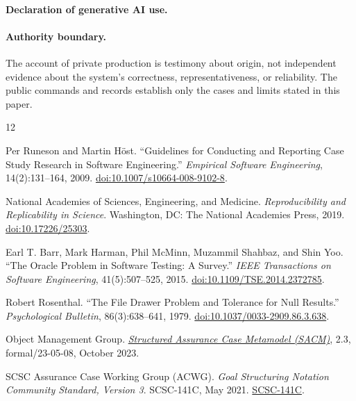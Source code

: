 \documentclass[11pt]{article}
\begin{document}
\paragraph{Declaration of generative AI use.} \paperfullaideclaration

\paragraph{Authority boundary.}
The account of private production is testimony about origin, not independent
evidence about the system's correctness, representativeness, or reliability.
The public commands and records establish only the cases and limits stated in
this paper.

\begin{thebibliography}{12}
\fontsize{7.5pt}{8.3pt}\selectfont
\raggedright
\setlength{\itemsep}{0pt}
\setlength{\parsep}{0pt}
\setlength{\parskip}{0pt}

Per Runeson and Martin H\"ost. ``Guidelines for Conducting and Reporting Case
Study Research in Software Engineering.'' \emph{Empirical Software
Engineering}, 14(2):131--164, 2009.
\href{https://doi.org/10.1007/s10664-008-9102-8}{doi:10.1007/s10664-008-9102-8}.

National Academies of Sciences, Engineering, and Medicine.
\emph{Reproducibility and Replicability in Science}. Washington, DC:
The National Academies Press, 2019.
\href{https://doi.org/10.17226/25303}{doi:10.17226/25303}.

Earl T. Barr, Mark Harman, Phil McMinn, Muzammil Shahbaz, and Shin Yoo.
``The Oracle Problem in Software Testing: A Survey.''
\emph{IEEE Transactions on Software Engineering}, 41(5):507--525, 2015.
\href{https://doi.org/10.1109/TSE.2014.2372785}{doi:10.1109/TSE.2014.2372785}.

Robert Rosenthal. ``The File Drawer Problem and Tolerance for Null Results.''
\emph{Psychological Bulletin}, 86(3):638--641, 1979.
\href{https://doi.org/10.1037/0033-2909.86.3.638}{doi:10.1037/0033-2909.86.3.638}.

Object Management Group.
\href{https://www.omg.org/spec/SACM/2.3/PDF}{\emph{Structured Assurance Case Metamodel (SACM)}},
2.3, formal/23-05-08, October 2023.

SCSC Assurance Case Working Group (ACWG).
\emph{Goal Structuring Notation Community Standard, Version 3}.
SCSC-141C, May 2021.
\href{https://scsc.uk/scsc-141c}{SCSC-141C}.


\end{thebibliography}
\end{document}
